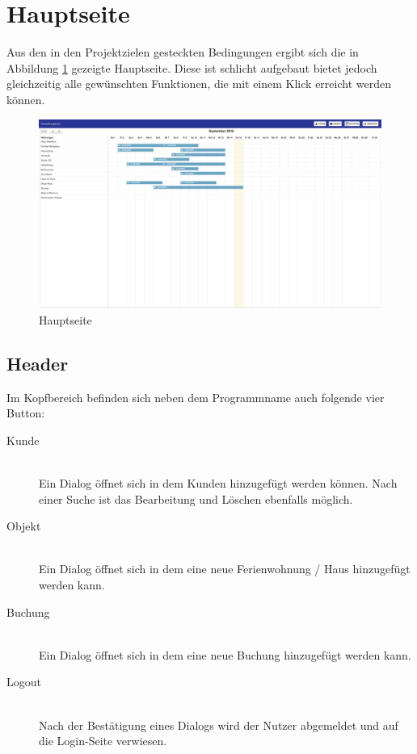 \section{Hauptseite}
Aus den in den Projektzielen gesteckten Bedingungen ergibt sich die in Abbildung \ref{frontend_mainpage} gezeigte Hauptseite.
Diese ist schlicht aufgebaut bietet jedoch gleichzeitig alle gewünschten Funktionen, die mit einem Klick erreicht werden können.

\begin{figure}[H]
\centering\includegraphics[width=1\textwidth]{images/frontend_mainpage.png}
\caption{Hauptseite}
\label{frontend_mainpage}
\end{figure}

\subsection{Header}
Im Kopfbereich befinden sich neben dem Programmname auch folgende vier Button:

\begin{description}
\item[Kunde]\hfill \\
Ein Dialog öffnet sich in dem Kunden hinzugefügt werden können. Nach einer Suche ist das Bearbeitung und Löschen ebenfalls möglich.
\item[Objekt]\hfill \\ 
Ein Dialog öffnet sich in dem eine neue Ferienwohnung / Haus hinzugefügt werden kann. 
\item[Buchung]\hfill \\ 
Ein Dialog öffnet sich in dem eine neue Buchung hinzugefügt werden kann. 
\item[Logout]\hfill \\ 
Nach der Bestätigung eines Dialogs wird der Nutzer abgemeldet und auf die Login-Seite verwiesen. 
\end{description}


